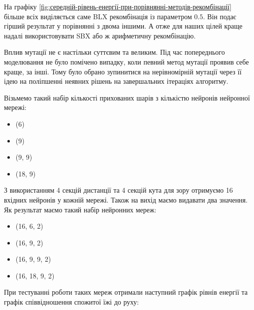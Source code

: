 На графіку \ref{fig:середній-рівень-енергії-при-порівнянні-методів-рекомбінації}
більше всіх виділяється саме BLX рекомбінація із параметром $0.5$.
Він подає гірший результат у порівнянні з двома іншими.
А отже для наших цілей краще надалі використовувати
SBX або ж арифметичну рекомбінацію.

Вплив мутації не є настільки суттєвим та великим.
Під час попереднього моделювання не було помічено
випадку, коли певний метод мутації проявив себе краще, за інші.
Тому було обрано зупинитися на нерівномірній мутації через
її ідею на поліпшенні неявних рішень на завершальних ітераціях
алгоритму.








Візьмемо такий набір кількості прихованих шарів з кількістю нейронів
нейронної мережі:
\begin{itemize}
  \item (6)
  \item (9)
  \item (9, 9)
  \item (18, 9)
\end{itemize}
З використанням 4 секцій дистанції та 4 секцій кута для зору
отримуємо 16 вхідних нейронів у кожній мережі. Також
на вихід маємо видавати два значення. Як результат маємо такий
набір нейронних мереж:
\begin{itemize}
  \item (16, 6, 2)
  \item (16, 9, 2)
  \item (16, 9, 9, 2)
  \item (16, 18, 9, 2)
\end{itemize}

При тестуванні роботи таких мереж отримали наступний графік рівнів енергії
та графік співвідношення спожитої їжі до руху:

